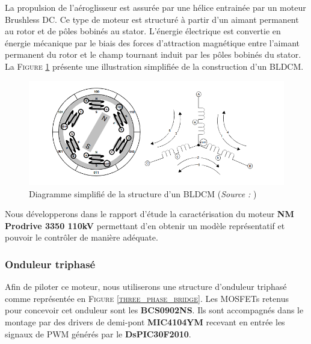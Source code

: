 \documentclass[a4paper,12pt]{report}
\begin{document}
			La propulsion de l'aéroglisseur est assurée par une hélice entrainée par un moteur Brushless DC. Ce type de moteur est structuré à partir d’un aimant permanent au rotor et de pôles
bobinés au stator. L’énergie électrique est convertie en énergie mécanique par le biais des forces
d’attraction magnétique entre l’aimant permanent du rotor et le champ tournant induit par les
pôles bobinés du stator. La \textsc{Figure \ref{struct_bldcm}} présente une illustration simplifiée de la construction d’un
BLDCM.
				\begin{figure}[h]
				 	\begin{center}
				 		\includegraphics[scale=0.7]{../Illus/struct_bldcm.png}
				 	\end{center}
				 	\caption{Diagramme simplifié de la structure d'un BLDCM (\textit{Source :} \cite{AN857})}
				 	\label{struct_bldcm}
				 \end{figure}
				 
			\vspace{-1em}
				 
			Nous développerons dans le rapport d'étude la caractérisation du moteur \textbf{NM Prodrive 3350 110kV} permettant d'en obtenir un modèle représentatif et pouvoir le contrôler de manière adéquate.
			
			\vspace{-1em}
				 
			\subsubsection{Onduleur triphasé}
			
			\vspace{-1em}
				 
			Afin de piloter ce moteur, nous utiliserons une structure d'onduleur triphasé comme représentée en \textsc{Figure \ref{three_phase_bridge}}. Les MOSFETs retenus pour concevoir cet onduleur sont les \textbf{BCS0902NS}. Ils sont accompagnés dans le montage par des drivers de demi-pont \textbf{MIC4104YM} recevant en entrée les signaux de PWM générés par le \textbf{DsPIC30F2010}.
			
\end{document}
